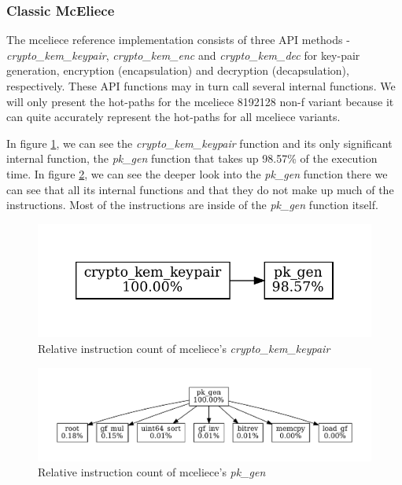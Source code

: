 \subsubsection{Classic McEliece}
The \gls{mceliece} reference implementation consists of three API methods - \textit{crypto\_kem\_keypair}, \textit{crypto\_kem\_enc} and \textit{crypto\_kem\_dec} for key-pair generation, encryption (encapsulation) and decryption (decapsulation), respectively. These API functions may in turn call several internal functions. We will only present the hot-paths for the \gls{mceliece} 8192128 non-f variant because it can quite accurately represent the hot-paths for all \gls{mceliece} variants.

In figure \ref{figure:result:hot-paths:classic-mceliece:crypto_kem_keypair}, we can see the \textit{crypto\_kem\_keypair} function and its only significant internal function, the \textit{pk\_gen} function that takes up 98.57\% of the execution time. In figure \ref{figure:result:hot-paths:classic-mceliece:pk_gen}, we can see the deeper look into the \textit{pk\_gen} function there we can see that all its internal functions and that they do not make up much of the instructions. Most of the instructions are inside of the \textit{pk\_gen} function itself.

\begin{figure}[H]
    \centering
    \includegraphics[scale=0.5]{chapters/results/hot-paths/classic-mceliece/8192128/crypto_kem_keypair.pdf}
    \caption{Relative instruction count of \gls{mceliece}'s \textit{crypto\_kem\_keypair}}
    \label{figure:result:hot-paths:classic-mceliece:crypto_kem_keypair}
\end{figure}

\begin{figure}[H]
    \centering
    \includegraphics[scale=0.5]{chapters/results/hot-paths/classic-mceliece/8192128/pk_gen.pdf}
    \caption{Relative instruction count of \gls{mceliece}'s \textit{pk\_gen}}
    \label{figure:result:hot-paths:classic-mceliece:pk_gen}
\end{figure}

